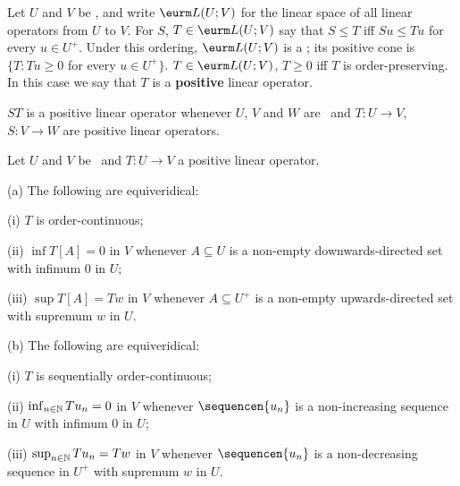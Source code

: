  Let $U$ and $V$ be \polss, and
write $\eurm L(U;V)$ for the linear space of all linear operators from
$U$ to $V$.
For $S$, $T\in\eurm L(U;V)$ say that $S\le T$ iff $Su\le Tu$ for every
$u\in U^+$.   Under this ordering, $\eurm L(U;V)$ is a \pols;  its
positive cone is
$\{T:Tu\ge 0$ for every $u\in U^+\}$.      
$T\in\eurm L(U;V)$, $T\ge 0$ iff $T$ is order-preserving.   In this case
we say that $T$ is a {\bf positive} linear operator.

$ST$ is a positive linear operator whenever $U$, $V$
and $W$ are \polss\ and $T:U\to V$, $S:V\to W$ are positive linear
operators.

Let $U$ and $V$ be \polss\ and $T:U\to V$ a positive linear operator.

(a) The following are equiveridical:

\quad(i) $T$ is order-continuous;

\quad(ii) $\inf T[A]=0$ in $V$ whenever $A\subseteq U$ is a non-empty
downwards-directed set with infimum $0$ in $U$;

\quad(iii) $\sup T[A]=Tw$ in
$V$ whenever $A\subseteq U^+$ is a non-empty upwards-directed set with
supremum $w$ in $U$.

(b) The following are equiveridical:

\quad(i) $T$ is sequentially
order-continuous;

\quad(ii) $\inf_{n\in\Bbb N}Tu_n=0$ in $V$ whenever
$\sequencen{u_n}$ is a non-increasing sequence in $U$ with infimum $0$
in $U$;

\quad(iii) $\sup_{n\in\Bbb N}Tu_n=Tw$ in $V$ whenever
$\sequencen{u_n}$ is a non-decreasing sequence in $U^+$ with supremum
$w$ in $U$.

